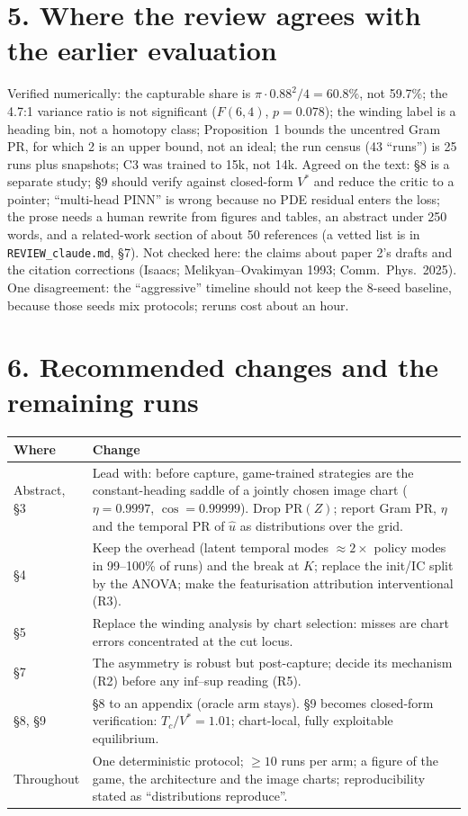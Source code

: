 \documentclass[10pt,a4paper]{article}
\newcommand{\PR}{\mathrm{PR}}
\begin{document}
\section*{5. Where the review agrees with the earlier evaluation}

Verified numerically: the capturable share is $\pi\cdot0.88^2/4=60.8\%$, not 59.7\%; the 4.7:1 variance ratio is not significant ($F(6,4)$, $p=0.078$); the winding label is a heading bin, not a homotopy class; Proposition~1 bounds the uncentred Gram PR, for which 2 is an upper bound, not an ideal; the run census (43 ``runs'') is 25 runs plus snapshots; C3 was trained to 15k, not 14k. Agreed on the text: \S8 is a separate study; \S9 should verify against closed-form $V^*$ and reduce the critic to a pointer; ``multi-head PINN'' is wrong because no PDE residual enters the loss; the prose needs a human rewrite from figures and tables, an abstract under 250 words, and a related-work section of about 50 references (a vetted list is in \texttt{REVIEW\_claude.md}, \S7). Not checked here: the claims about paper 2's drafts and the citation corrections (Isaacs; Melikyan--Ovakimyan 1993; Comm.\ Phys.\ 2025). One disagreement: the ``aggressive'' timeline should not keep the 8-seed baseline, because those seeds mix protocols; reruns cost about an hour.

\section*{6. Recommended changes and the remaining runs}

\begin{small}
\begin{tabularx}{\textwidth}{@{}p{2.3cm} L@{}}
\toprule
Where & Change \\
\midrule
Abstract, \S3 & Lead with: before capture, game-trained strategies are the constant-heading saddle of a jointly chosen image chart ($\eta=0.9997$, $\cos=0.99999$). Drop $\PR(Z)$; report Gram PR, $\eta$ and the temporal PR of $\hat u$ as distributions over the grid. \\
\S4 & Keep the overhead (latent temporal modes $\approx2\times$ policy modes in 99--100\% of runs) and the break at $K$; replace the init/IC split by the ANOVA; make the featurisation attribution interventional (R3). \\
\S5 & Replace the winding analysis by chart selection: misses are chart errors concentrated at the cut locus. \\
\S7 & The asymmetry is robust but post-capture; decide its mechanism (R2) before any inf--sup reading (R5). \\
\S8, \S9 & \S8 to an appendix (oracle arm stays). \S9 becomes closed-form verification: $T_c/V^*=1.01$; chart-local, fully exploitable equilibrium. \\
Throughout & One deterministic protocol; $\ge10$ runs per arm; a figure of the game, the architecture and the image charts; reproducibility stated as ``distributions reproduce''. \\
\bottomrule
\end{tabularx}
\end{small}
\end{document}
